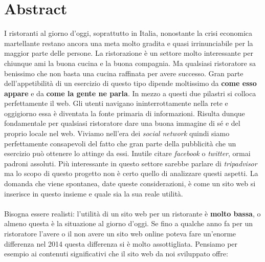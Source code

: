 \section{Abstract}

I ristoranti al giorno d'oggi, soprattutto in Italia, nonostante la crisi economica martellante restano ancora una meta molto gradita e quasi irrinunciabile per la maggior parte delle persone. La ristorazione è un settore molto interessante per chiunque ami la buona cucina e la buona compagnia. Ma qualsiasi ristoratore sa benissimo che non basta una cucina raffinata per avere successo. Gran parte dell'appetibilità di un esercizio di questo tipo dipende moltissimo da \textbf{come esso appare} e da \textbf{come la gente ne parla}. In mezzo a questi due pilastri si colloca perfettamente il web. Gli utenti navigano ininterrottamente nella rete e oggigiorno essa è diventata la fonte primaria di informazioni. Risulta dunque fondamentale per qualsiasi ristoratore dare una buona immagine di sé e del proprio locale nel web. Viviamo nell'era dei \textit{social network} quindi siamo perfettamente consapevoli del fatto che gran parte della pubblicità che un esercizio può ottenere lo attinge da essi. Inutile citare \textit{facebook} o \textit{twitter}, ormai padroni assoluti. Più interessante in questo settore sarebbe parlare di \textit{tripadvisor} ma lo scopo di questo progetto non è certo quello di analizzare questi aspetti. La domanda che viene spontanea, date queste considerazioni, è come un sito web si inserisce in questo insieme e quale sia la sua reale utilità. \\ \\
Bisogna essere realisti: l'utilità di un sito web per un ristorante è \textbf{molto bassa}, o almeno questa è la situazione al giorno d'oggi. Se fino a qualche anno fa per un ristoratore l'avere o il non avere un sito web online poteva fare un'enorme differenza nel 2014 questa differenza si è molto assottigliata. Pensiamo per esempio ai contenuti significativi che il sito web da noi sviluppato offre:

